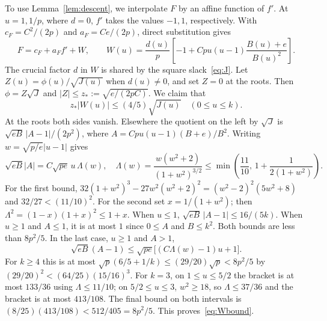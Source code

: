 \documentclass[11pt]{article}
\begin{document}
To use Lemma~\ref{lem:descent}, we interpolate \(F\) by an
affine function of \(f'\). At \(u=1,1/p\), where \(d=0\),
\(f'\) takes the values \(-1,1\), respectively. With
\(c_F=C^2/(2p)\) and \(a_F=Ce/(2p)\), direct substitution gives
\begin{equation}\label{eq:interpol}
F=c_F+a_F f'+W,\qquad
W(u)=\frac{d(u)}p\left[-1+C p u(u-1)\frac{B(u)+e}{B(u)^2}\right].
\end{equation}
The crucial factor \(d\) in \(W\) is shared by the square
slack~\eqref{eq:J}. Let \(Z(u)=\phi(u)/\sqrt{J(u)}\) when
\(d(u)\ne0\), and set \(Z=0\) at the roots. Then
\(\phi=Z\sqrt J\) and \(|Z|\le z_*:=\sqrt{e/(2pC)}\).
We claim that
\begin{equation}\label{eq:Wbound}
z_*|W(u)|\le(4/5)\sqrt{J(u)}\quad(0\le u\le k).
\end{equation}
At the roots both sides vanish. Elsewhere the quotient on the
left by \(\sqrt J\) is \(\sqrt{eB}\,|A-1|/(2p^2)\), where
\(A=C p u(u-1)(B+e)/B^2\).
Writing \(w=\sqrt{p/e}|u-1|\) gives
\[
\sqrt{eB}|A|=C\sqrt{pe}\,u\,\Lambda(w),\quad
\Lambda(w)=\frac{w(w^2+2)}{(1+w^2)^{3/2}}
\le \min\left(\frac{11}{10},\,1+\frac{1}{2(1+w^2)}\right).
\]
For the first bound, \(32(1+w^2)^3-27w^2(w^2+2)^2
=(w^2-2)^2(5w^2+8)\) and \(32/27<(11/10)^2\).
For the second set \(x=1/(1+w^2)\); then
\(\Lambda^2=(1-x)(1+x)^2\le1+x\).
When \(u\le1\), \(\sqrt{eB}\,|A-1|\le16/(5k)\).
When \(u\ge1\) and \(A\le1\), it is at most \(1\)
since \(0\le A\) and \(B\le k^2\). Both bounds are less than \(8p^2/5\).
In the last case, \(u\ge1\) and \(A>1\),
\[
\sqrt{eB}(A-1)\le \sqrt{pe}\big[(C\Lambda(w)-1)u+1\big].
\]
For \(k\ge4\) this is at most
\(\sqrt p(6/5+1/k)\le(29/20)\sqrt p<8p^2/5\)
by \((29/20)^2<(64/25)(15/16)^3\).
For \(k=3\), on \(1\le u\le5/2\) the bracket is at
most \(133/36\) using \(\Lambda\le11/10\); on \(5/2\le u\le3\),
\(w^2\ge18\), so \(\Lambda\le37/36\) and the bracket is at most
\(413/108\). The final bound on both intervals is
\((8/25)(413/108)<512/405=8p^2/5\). This proves~\eqref{eq:Wbound}.
\end{document}

